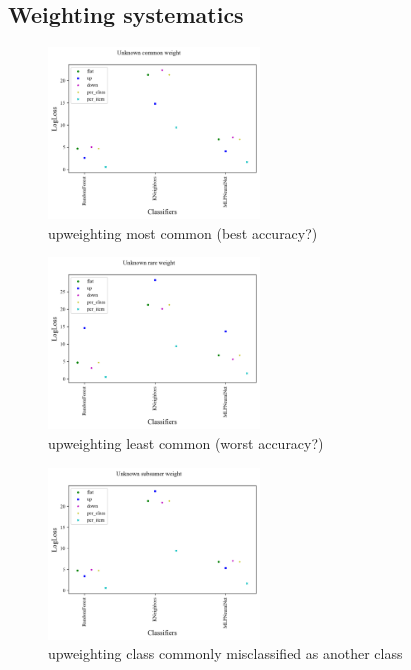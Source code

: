 \subsection{Weighting systematics}
\label{sec:weight_res}

\begin{figure}
	\begin{center}
		\includegraphics[width=0.5\textwidth]{./fig/systematic_Unknown_common.png}
		\caption{upweighting most common (best accuracy?)}
		\label{fig:systematic_common}
	\end{center}
\end{figure}

\begin{figure}
	\begin{center}
		\includegraphics[width=0.5\textwidth]{./fig/systematic_Unknown_rare.png}
		\caption{upweighting least common (worst accuracy?)}
		\label{fig:systematic_rare}
	\end{center}
\end{figure}

\begin{figure}
	\begin{center}
		\includegraphics[width=0.5\textwidth]{./fig/systematic_Unknown_subsumer.png}
		\caption{upweighting class commonly misclassified as another class}
		\label{fig:systematic_subsumer}
	\end{center}
\end{figure}

